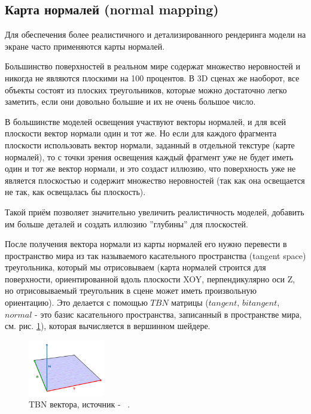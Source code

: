 \documentclass[14pt]{extarticle}
\begin{document}
\subsection{Карта нормалей (normal mapping)}
Для обеспечения более реалистичного и детализированного рендеринга модели на экране часто применяются карты нормалей. 

Большинство поверхностей в реальном мире содержат множество неровностей и никогда не являются плоскими на 100 процентов. В 3D сценах же наоборот, все объекты состоят из плоских треугольников, которые можно достаточно легко заметить, если они довольно большие и их не очень большое число.

В большинстве моделей освещения участвуют векторы нормалей, и для всей плоскости вектор нормали один и тот же. Но если для каждого фрагмента плоскости использовать вектор нормали, заданный в отдельной текстуре (карте нормалей), то с точки зрения освещения каждый фрагмент уже не будет иметь один и тот же вектор нормали, и это создаст иллюзию, что поверхность уже не является плоскостью и содержит множество неровностей (так как она освещается не так, как освещалась бы плоскость). 

Такой приём позволяет значительно увеличить реалистичность моделей, добавить им больше деталей и создать иллюзию ''глубины'' для плоскостей.

После получения вектора нормали из карты нормалей его нужно перевести в пространство мира из так называемого касательного пространства (tangent space) треугольника, который мы отрисовываем (карта нормалей строится для поверхности, ориентированной вдоль плоскости XOY, перпендикулярно оси Z, но отрисовываемый треугольник в сцене может иметь произвольную ориентацию). Это делается с помощью $TBN$ матрицы ($tangent$, $bitangent$, $normal$ - это базис касательного пространства, записанный в пространстве мира, см. рис.  \ref{fig:tbn}), которая вычисляется в вершинном шейдере. 

\begin{figure}
	\label{fig:tbn}
	\caption{TBN вектора, источник - ~\cite{tbn}.}
	\includegraphics[width=0.3\textwidth]{tbn.png}
\end{figure}
\end{document}
